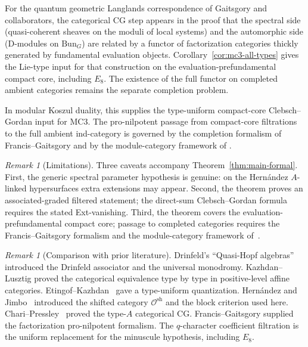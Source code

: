 \documentclass[11pt,reqno]{amsart}
\theoremstyle{definition}
\theoremstyle{remark}
\newtheorem{remark}[theorem]{Remark}
\newcommand{\cO}{\mathcal{O}}
\numberwithin{equation}{section}
\begin{document}
For the quantum geometric Langlands correspondence of
Gaitsgory and collaborators, the categorical CG step appears
in the proof that the spectral side (quasi-coherent sheaves on
the moduli of local systems) and the automorphic side (D-modules
on $\mathrm{Bun}_G$) are related by a functor of factorization
categories thickly generated by fundamental evaluation objects.
Corollary~\ref{cor:mc3-all-types} gives the Lie-type input for
that construction on the evaluation-prefundamental compact core,
including $E_8$. The existence of the full functor on completed
ambient categories remains the separate completion problem.

In modular Koszul duality, this supplies the
type-uniform compact-core Clebsch--Gordan input for MC3. The
pro-nilpotent passage from compact-core filtrations to the full
ambient ind-category is governed by the completion formalism of
Francis--Gaitsgory and by the module-category framework of
\cite{LorgatMKD}.

\begin{remark}[Limitations]
\label{rem:limitations}
Three caveats accompany Theorem~\ref{thm:main-formal}. First, the
generic spectral parameter hypothesis is genuine: on the
Hern\'andez $A$-linked hypersurfaces extra extensions may appear.
Second, the theorem proves an associated-graded filtered statement;
the direct-sum Clebsch--Gordan formula requires the stated
Ext-vanishing. Third, the theorem covers the
evaluation-prefundamental compact core; passage to completed
categories requires the Francis--Gaitsgory formalism and the
module-category framework of~\cite{LorgatMKD}.
\end{remark}

\begin{remark}[Comparison with prior literature]
\label{rem:comparison}
Drinfeld's ``Quasi-Hopf algebras''~\cite{Drinfeld90} introduced the
Drinfeld associator and the universal monodromy. Kazhdan--Lusztig
\cite{KL93a, KL93b, KL94a, KL94b} proved the categorical
equivalence type by type in positive-level affine categories.
Etingof--Kazhdan~\cite{EK96, EK98} gave a type-uniform
quantization. Hern\'andez and Jimbo~\cite{HernandezJimbo12}
introduced the shifted category $\cO^{\mathrm{sh}}$ and the
block criterion used here. Chari--Pressley~\cite{ChariPressley94}
proved the type-$A$ categorical CG. Francis--Gaitsgory
\cite{FG12} supplied the factorization pro-nilpotent formalism.
The $q$-character coefficient filtration is the uniform replacement
for the minuscule hypothesis, including $E_8$.
\end{remark}
\end{document}
